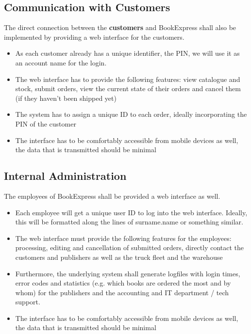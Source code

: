 \documentclass[11pt,a4paper,oneside,svgnames]{report}
\begin{document}
\subsection{Communication with Customers}
The direct connection between the \textbf{customers} and BookExpress shall also be implemented by providing a web interface for the customers.\\
\begin{itemize}
\item As each customer already has a unique identifier, the PIN, we will use it as an account name for the login.
\item The web interface has to provide the following features: view catalogue and stock, submit orders, view  the current state of their orders and cancel them (if they haven't been shipped yet)
\item The system has to assign a unique ID to each order, ideally incorporating the PIN of the customer
\item The interface has to be comfortably accessible from mobile devices as well, the data that is transmitted should be minimal\\
\end{itemize}
\subsection{Internal Administration}
The employees of BookExpress shall be provided a web interface as well. 
\begin{itemize}
\item Each employee will get a unique user ID to log into the web interface. Ideally, this will be formatted along the lines of surname.name or something similar.
\item The web interface must provide the following features for the employees: processing, editing and cancellation  of submitted orders, directly contact the customers and publishers as well as the truck fleet and the warehouse
\item Furthermore, the underlying system shall generate logfiles with login times, error codes and statistics (e.g. which books are ordered the most and by whom) for the publishers and the accounting and IT department / tech support.
\item The interface has to be comfortably accessible from mobile devices as well, the data that is transmitted should be minimal\\ 
\end{itemize}
\end{document}
